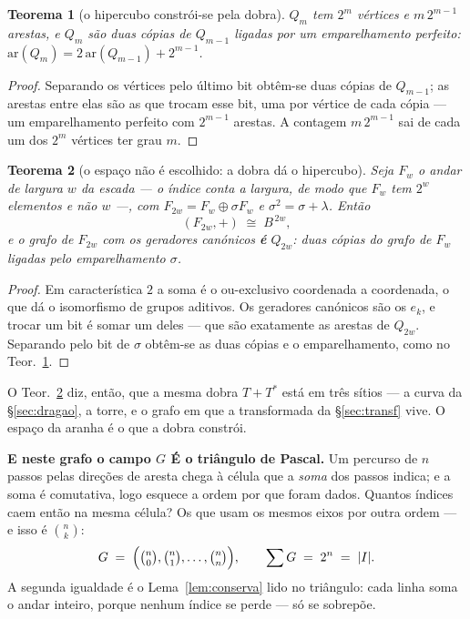 \documentclass[11pt,a4paper]{article}
\newtheorem{teorema}{Teorema}
\begin{document}
\begin{teorema}[o hipercubo constrói-se pela dobra]\label{thm:hiper}
$Q_m$ tem $2^m$ vértices e $m\,2^{m-1}$ arestas, e $Q_m$ são duas cópias de
$Q_{m-1}$ ligadas por um emparelhamento perfeito:
$\mathrm{ar}(Q_m)=2\,\mathrm{ar}(Q_{m-1})+2^{m-1}$.
\end{teorema}

\begin{proof}
Separando os vértices pelo último bit obtêm-se duas cópias de $Q_{m-1}$; as
arestas entre elas são as que trocam esse bit, uma por vértice de cada cópia ---
um emparelhamento perfeito com $2^{m-1}$ arestas. A contagem $m\,2^{m-1}$ sai de
cada um dos $2^m$ vértices ter grau $m$.
\end{proof}

\begin{teorema}[o espaço não é escolhido: a dobra dá o hipercubo]\label{thm:espaco}
Seja $F_w$ o andar de largura $w$ da escada --- o índice conta a
\emph{largura}, de modo que $F_w$ tem $2^{w}$ elementos e não $w$ ---, com
$F_{2w}=F_w\oplus\sigma F_w$ e $\sigma^2=\sigma+\lambda$. Então
\[
(F_{2w},+)\;\cong\;B^{\,2w},
\]
e o grafo de $F_{2w}$ com os geradores canónicos \textbf{é} $Q_{2w}$: duas
cópias do grafo de $F_w$ ligadas pelo emparelhamento $\sigma$.
\end{teorema}

\begin{proof}
Em característica $2$ a soma é o ou-exclusivo coordenada a coordenada, o que dá
o isomorfismo de grupos aditivos. Os geradores canónicos são os $e_k$, e trocar
um bit é somar um deles --- que são exatamente as arestas de $Q_{2w}$. Separando
pelo bit de $\sigma$ obtêm-se as duas cópias e o emparelhamento, como no
Teor.~\ref{thm:hiper}.
\end{proof}

\medskip\noindent O Teor.~\ref{thm:espaco} diz, então, que a mesma dobra
$T+T^{*}$ está em três sítios --- a curva da §\ref{sec:dragao}, a torre, e o
grafo em que a transformada da §\ref{sec:transf} vive. O espaço da aranha é o que
a dobra constrói.

\medskip\noindent\textbf{E neste grafo o campo $G$ É o triângulo de Pascal.} Um
percurso de $n$ passos pelas direções de aresta chega à célula que a \emph{soma}
dos passos indica; e a soma é comutativa, logo esquece a ordem por que foram
dados. Quantos índices caem então na mesma célula? Os que usam os mesmos eixos
por outra ordem --- e isso é $\binom{n}{k}$:
\[
G \;=\; \Bigl(\tbinom{n}{0},\tbinom{n}{1},\dots,\tbinom{n}{n}\Bigr),
\qquad
\sum G \;=\; 2^{n} \;=\; \lvert I\rvert .
\]
A segunda igualdade é o Lema~\ref{lem:conserva} lido no triângulo: cada linha
soma o andar inteiro, porque nenhum índice se perde --- só se sobrepõe.
\end{document}
